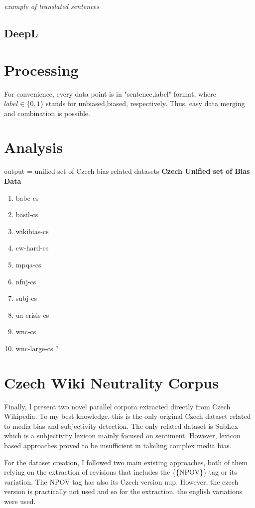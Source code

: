 \textit{example of translated sentences}
\subsection{DeepL}
\section{Processing}\label{processing}
For convenience, every data point is in "sentence,label" format, where $label \in \{0,1\}$ stands for unbiased,biased, respectively. Thus, easy data merging and combination is possible.
\section{Analysis}
output = unified set of Czech bias related datasets\label{f}
\textbf{Czech Unified set of Bias Data}
\begin{enumerate}
    \item babe-cs
    \item basil-cs
    \item wikibias-cs
    \item cw-hard-cs
    \item mpqa-cs
    \item nfnj-cs
    \item subj-cs
    \item ua-crisis-cs
    \item wnc-cs
    \item wnc-large-cs ?
\end{enumerate}

\newpage

\section{Czech Wiki Neutrality Corpus}
Finally, I present two novel parallel corpora extracted directly from Czech Wikipedia. To my best knowledge, this is the only original Czech dataset related to media bias and subjectivity detection. The only related dataset is SubLex which is a subjectivity lexicon mainly focused on sentiment. However, lexicon based approaches proved to be insufficient in takcling complex media bias.

For the dataset creation, I followed two main existing approaches, both of them relying on the extraction of revisions that includes the \{\{NPOV\}\} tag or its variation. The NPOV tag has also its Czech version \Gls{nup}. However, the czech version is practically not used and so for the extraction, the english variations were used.

